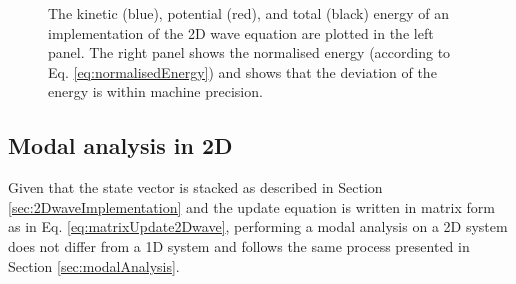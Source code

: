 \begin{figure}[h]
    \centering
      \caption{The kinetic (blue), potential (red), and total (black) energy of an implementation of the 2D wave equation are plotted in the left panel. The right panel shows the normalised energy (according to Eq. \eqref{eq:normalisedEnergy}) and shows that the deviation of the energy is within machine precision. \label{fig:energy2Dwave}}
\end{figure}

\subsection{Modal analysis in 2D}\label{sec:2DmodalAnalysis}
Given that the state vector is stacked as described in Section \ref{sec:2DwaveImplementation} and the update equation is written in matrix form as in Eq. \eqref{eq:matrixUpdate2Dwave}, performing a modal analysis on a 2D system does not differ from a 1D system and follows the same process presented in Section \ref{sec:modalAnalysis}.

